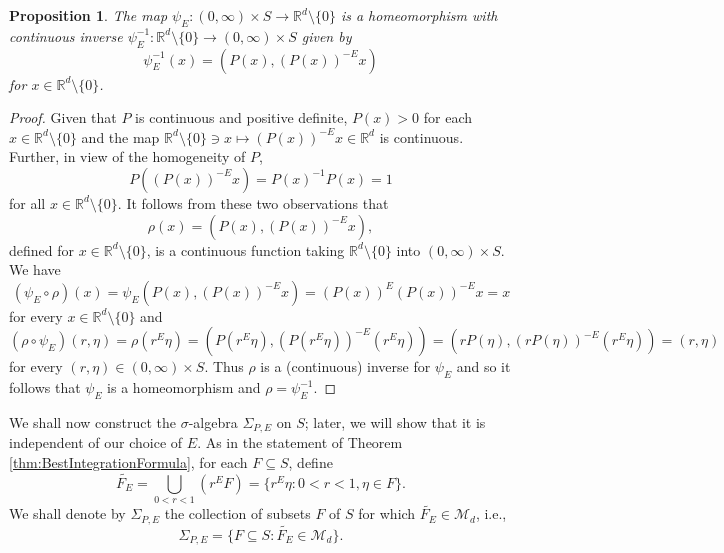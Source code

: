\documentclass[11pt]{article}
\newtheorem{proposition}[theorem]{Proposition}
\theoremstyle{remark}
\begin{document}
\begin{proposition}\label{prop:PsiHomeomorphism}
The map $\psi_E:(0,\infty)\times S\to\mathbb{R}^d\setminus\{0\}$ is a homeomorphism with continuous inverse $\psi_E^{-1}:\mathbb{R}^d\setminus\{0\}\to (0,\infty)\times S$ given by
\begin{equation*}
\psi_E^{-1}(x)=(P(x),(P(x))^{-E}x)
\end{equation*}
for $x\in\mathbb{R}^d\setminus\{0\}$.
\end{proposition}

\begin{proof}
Given that $P$ is continuous and positive definite, $P(x)>0$ for each $x\in \mathbb{R}^d\setminus\{0\}$ and the map $\mathbb{R}^d\setminus\{0\}\ni x \mapsto (P(x))^{-E}x\in \mathbb{R}^d$ is continuous. Further, in view of the homogeneity of $P$,
\begin{equation*}
P\left((P(x))^{-E} x \right)=P(x)^{-1}P(x)=1
\end{equation*}
for all $x\in\mathbb{R}^d\setminus\{0\}$. It follows from these two observations that
\begin{equation*}
\rho(x)=(P(x),(P(x))^{-E}x),
\end{equation*}
defined for $x\in\mathbb{R}^d\setminus\{0\}$, is a continuous function taking $\mathbb{R}^d\setminus\{0\}$ into $(0,\infty)\times S$. We have
\begin{equation*}
(\psi_E\circ \rho)(x)=\psi_E(P(x),(P(x))^{-E}x)=(P(x))^{E}(P(x))^{-E}x=x
\end{equation*}
for every $x\in \mathbb{R}^d\setminus \{0\}$ and
\begin{equation*}
(\rho\circ\psi_E)(r,\eta)=\rho(r^E\eta)=(P(r^{E}\eta),(P(r^{E}\eta))^{-E}(r^E\eta))=(rP(\eta),(rP(\eta))^{-E}(r^{E}\eta))=(r,\eta)
\end{equation*}
for every $(r,\eta)\in (0,\infty)\times S$. Thus $\rho$ is a (continuous) inverse for $\psi_E$ and so it follows that $\psi_E$ is a homeomorphism and $\rho=\psi_E^{-1}$.
\end{proof}



\noindent We shall now construct the $\sigma$-algebra $\Sigma_{P,E}$ on $S$; later, we will show that it is independent of our choice of $E$. As in the statement of Theorem \ref{thm:BestIntegrationFormula}, for each $F\subseteq S$, define
\begin{equation*}
\widetilde{F_E}=\bigcup_{0<r<1}\left(r^E F\right)=\{r^E\eta:0<r<1,\eta\in F\}. 
\end{equation*}
We shall denote by $\Sigma_{P,E}$ the collection of subsets $F$ of $S$ for which $\widetilde{F_E}\in\mathcal{M}_d$, i.e.,  
\begin{equation*}
\Sigma_{P,E}=\{F\subseteq S:\widetilde{F_E}\in\mathcal{M}_d\}.
\end{equation*}
\end{document}
